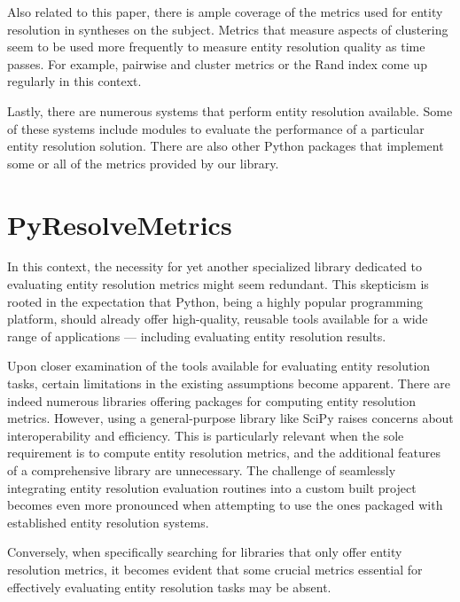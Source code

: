 \documentclass[a4paper,twoside]{article}
\begin{document}
    Also related to this paper, there is ample coverage of the metrics used for
    entity resolution in syntheses on the subject\cite{vldb2010,hitesh2012,Tal11}.
    Metrics that measure aspects of clustering seem to be used more frequently
    to measure entity resolution quality as time passes.
    For example, pairwise and cluster metrics\cite{Men10, huang2006efficient} or
    the Rand index\cite{tal2007algebraic} come up regularly in this context.

    Lastly, there are numerous systems that perform entity resolution available.
    Some of these systems include modules to evaluate the performance of a
    particular entity resolution solution\cite{fever2009,magellan2020,oyster2012}.
    There are also other Python packages that implement some or all of the
    metrics provided by our library\cite{nmeth2020scipy,ereval}.

    \section{PyResolveMetrics}\label{sec:library}

    In this context, the necessity for yet another specialized library dedicated
    to evaluating entity resolution metrics might seem redundant.
    This skepticism is rooted in the expectation that Python, being a highly
    popular programming platform, should already offer high-quality, reusable
    tools available for a wide range of applications --- including evaluating
    entity resolution results.
    
    Upon closer examination of the tools available for evaluating entity
    resolution tasks, certain limitations in the existing assumptions become
    apparent.
    There are indeed numerous libraries offering packages for computing entity
    resolution metrics.
    However, using a general-purpose library like SciPy raises concerns about
    interoperability and efficiency.
    This is particularly relevant when the sole requirement is to compute entity
    resolution metrics, and the additional features of a comprehensive library
    are unnecessary.
    The challenge of seamlessly integrating entity resolution evaluation
    routines into a custom built project becomes even more pronounced when
    attempting to use the ones packaged with established entity resolution
    systems\cite{oyster2012,jedai2017,deepm2020,magellan2020}.
    
    Conversely, when specifically searching for libraries that only offer entity
    resolution metrics, it becomes evident that some crucial metrics essential
    for effectively evaluating entity resolution tasks may be absent\cite{ereval}.
\end{document}
